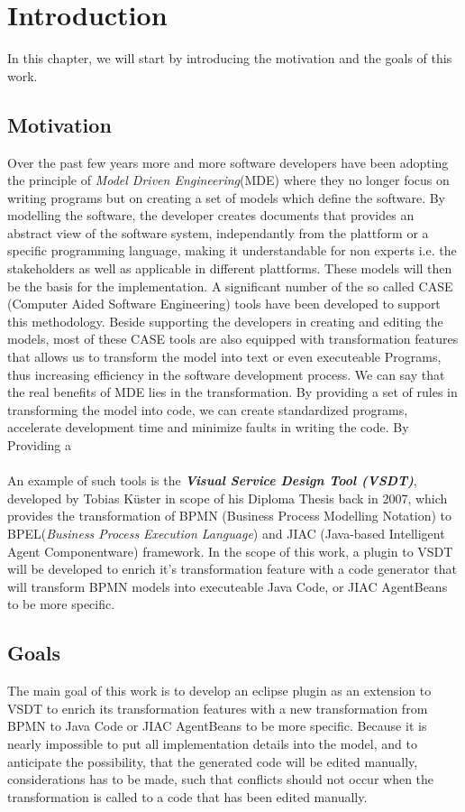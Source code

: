 \chapter{Introduction}
In this chapter, we will start by introducing the motivation and the goals of this work. 
\section{Motivation}
\label{sec:Motivation}
Over the past few years more and more software developers have been adopting the principle of \textit{Model Driven Engineering}(MDE) where 
they no longer focus on writing programs but on creating a set of models which define the software. By modelling the software, the developer creates documents that provides an abstract view of the software system, independantly from the plattform or a specific programming language, making it understandable for non experts i.e. the stakeholders as well as applicable in different plattforms. These models will then be the basis for the implementation. A significant number of the so called  CASE (Computer Aided Software Engineering) tools have been developed to support this methodology. Beside supporting the developers in creating and editing the models, most of these CASE tools are also equipped with transformation features that allows us to transform the model into text or even executeable Programs, thus increasing efficiency in the software development process. We can say that the real benefits of MDE lies in the transformation. By providing a set of rules in transforming the model into code, we can create standardized programs, accelerate development time and minimize faults in writing the code. By Providing a \\\\
An example of such tools is the \textbf{\textit{Visual Service Design Tool (VSDT)}}, developed by Tobias K\"uster in scope of his Diploma Thesis
back in 2007, which provides the transformation of BPMN (Business Process Modelling Notation) to BPEL(\textit{Business Process Execution Language}) and JIAC (Java-based Intelligent Agent Componentware) framework. In the scope of this work, a plugin to VSDT will be developed to enrich it's transformation feature with a code generator that will transform BPMN models into executeable Java Code, or JIAC AgentBeans to be more specific. 

\section{Goals}
\label{sec:Goals}
The main goal of this work is to develop an eclipse plugin as an extension to VSDT to enrich its transformation features with a new transformation from BPMN to Java Code or JIAC AgentBeans to be more specific. Because it is nearly impossible to put all implementation  details into the model, and to anticipate the possibility, that the generated code will be edited manually, considerations has to be made, such that conflicts should not occur when the transformation is called to a code that has been edited manually. 


